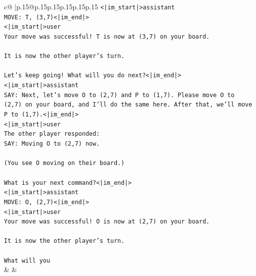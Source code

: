 \documentclass{article}
\begin{document}
{\begin{supertabular}{c@{$\;$}|p{.15\linewidth}@{}p{.15\linewidth}p{.15\linewidth}p{.15\linewidth}p{.15\linewidth}p{.15\linewidth}}
{{{\texttt{<|im\_start|>assistant} \\
\texttt{MOVE: T, (3,7)<|im\_end|>} \\
\texttt{<|im\_start|>user} \\
\texttt{Your move was successful! T is now at (3,7) on your board.} \\
\\ 
\texttt{It is now the other player's turn.} \\
\\ 
\texttt{Let's keep going! What will you do next?<|im\_end|>} \\
\texttt{<|im\_start|>assistant} \\
\texttt{SAY: Next, let's move O to (2,7) and P to (1,7). Please move O to (2,7) on your board, and I'll do the same here. After that, we'll move P to (1,7).<|im\_end|>} \\
\texttt{<|im\_start|>user} \\
\texttt{The other player responded:} \\
\texttt{SAY: Moving O to (2,7) now.} \\
\\ 
\texttt{(You see O moving on their board.)} \\
\\ 
\texttt{What is your next command?<|im\_end|>} \\
\texttt{<|im\_start|>assistant} \\
\texttt{MOVE: O, (2,7)<|im\_end|>} \\
\texttt{<|im\_start|>user} \\
\texttt{Your move was successful! O is now at (2,7) on your board.} \\
\\ 
\texttt{It is now the other player's turn.} \\
\\ 
\texttt{What will you} \\
            }
        }
    }
    & & \\ \\


\end{supertabular}}
\end{document}
